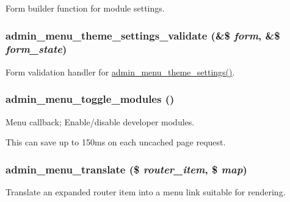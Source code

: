 Form builder function for module settings. \hypertarget{admin__menu_8inc_a773e8076793591c82ba893436f46153c}{
\subsubsection[{admin\_\-menu\_\-theme\_\-settings\_\-validate}]{\setlength{\rightskip}{0pt plus 5cm}admin\_\-menu\_\-theme\_\-settings\_\-validate (\&\$ {\em form}, \/  \&\$ {\em form\_\-state})}}
\label{admin__menu_8inc_a773e8076793591c82ba893436f46153c}
Form validation handler for \hyperlink{admin__menu_8inc_a4e3734f65911708ed221edc2a7007a23}{admin\_\-menu\_\-theme\_\-settings()}. \hypertarget{admin__menu_8inc_ab2b3513df09bbd7a3deae15086d4898e}{
\subsubsection[{admin\_\-menu\_\-toggle\_\-modules}]{\setlength{\rightskip}{0pt plus 5cm}admin\_\-menu\_\-toggle\_\-modules ()}}
\label{admin__menu_8inc_ab2b3513df09bbd7a3deae15086d4898e}
Menu callback; Enable/disable developer modules.

This can save up to 150ms on each uncached page request. \hypertarget{admin__menu_8inc_a6f21769e09533eece734c5f86e777283}{
\subsubsection[{admin\_\-menu\_\-translate}]{\setlength{\rightskip}{0pt plus 5cm}admin\_\-menu\_\-translate (\$ {\em router\_\-item}, \/  \$ {\em map})}}
\label{admin__menu_8inc_a6f21769e09533eece734c5f86e777283}
Translate an expanded router item into a menu link suitable for rendering.


